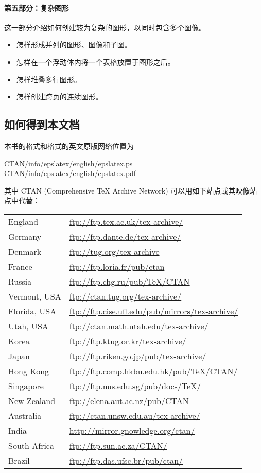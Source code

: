 \paragraph{第五部分：复杂图形}
这一部分介绍如何创建较为复杂的图形，以同时包含多个图像。
\begin{itemize}
	\item 怎样形成并列的图形、图像和子图。
	\item 怎样在一个浮动体内将一个表格放置于图形之后。
	\item 怎样堆叠多行图形。
	\item 怎样创建跨页的连续图形。
\end{itemize}

\subsection*{如何得到本文档}
本书的格式和格式的英文原版网络位置为
\begin{center}
	\href{ftp://ctan.tug.org/tex-archive/info/epslatex/english/epslatex.ps}{CTAN/info/epslatex/english/epslatex.ps}\\
	\href{ftp://ctan.tug.org/tex-archive/info/epslatex/english/epslatex.pdf}{CTAN/info/epslatex/english/epslatex.pdf}
\end{center}
其中 CTAN (Comprehensive \TeX{} Archive Network) 可以用如下站点或其映像站点中代替：
\begin{center}\label{ctan-sites}
	\begin{tabular}{ll}
	England & \url{ftp://ftp.tex.ac.uk/tex-archive/} \\
	Germany & \url{ftp://ftp.dante.de/tex-archive/} \\
	Denmark & \url{ftp://tug.org/tex-archive} \\
	France & \url{ftp://ftp.loria.fr/pub/ctan} \\
	Russia & \url{ftp://ftp.chg.ru/pub/TeX/CTAN} \\
	Vermont, USA & \url{ftp://ctan.tug.org/tex-archive/} \\
	Florida, USA & \url{ftp://ftp.cise.ufl.edu/pub/mirrors/tex-archive/} \\
	Utah, USA & \url{ftp://ctan.math.utah.edu/tex-archive/} \\
	Korea & \url{ftp://ftp.ktug.or.kr/tex-archive/} \\
	Japan & \url{ftp://ftp.riken.go.jp/pub/tex-archive/} \\
	Hong Kong & \url{ftp://ftp.comp.hkbu.edu.hk/pub/TeX/CTAN/} \\
	Singapore & \url{ftp://ftp.nus.edu.sg/pub/docs/TeX/} \\
	New Zealand & \url{ftp://elena.aut.ac.nz/pub/CTAN} \\
	Australia & \url{ftp://ctan.unsw.edu.au/tex-archive/} \\
	India & \url{http://mirror.gnowledge.org/ctan/} \\
	South Africa & \url{ftp://ftp.sun.ac.za/CTAN/} \\
	Brazil & \url{ftp://ftp.das.ufsc.br/pub/ctan/}
	\end{tabular}
\end{center}
